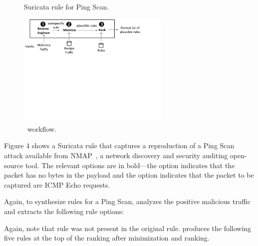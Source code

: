 \documentclass[sigconf,review, anonymous]{acmart}
\begin{document}
\begin{figure}[h!]
  \vspace{1ex}
  
  \caption{Suricata rule for Ping Scan.}
  \label{fig:pingscan-example}
  \vspace{1ex}  
\end{figure}

\begin{figure}[ht!]
  \centering
  \includegraphics[trim=0 350 100 0,clip,width=0.65\textwidth]{figs/nids-workflow}
  \caption{\tname\ workflow.}
  \label{fig:overview}
  \vspace{-1ex}
\end{figure}


Figure 4 shows a Suricata rule that captures a reproduction of a Ping
Scan attack available from NMAP~\cite{netmap}, a network discovery and
security auditing open-source tool. The relevant options are in
bold---the option  indicates that the packet has no
bytes in the payload and the option  indicates that
the packet to be captured are ICMP Echo requests.

Again, to synthesize rules for a Ping Scan, \tname{} analyzes the
positive malicious traffic and extracts the following rule options:

\begin{figure}[h]
  \vspace{-2ex}
  
  \vspace{-3ex}  
\end{figure}


Again, note that rule  was not present in the original
rule.  \tname{} produces the following five rules at the top of the
ranking after minimization and ranking.
\end{document}
